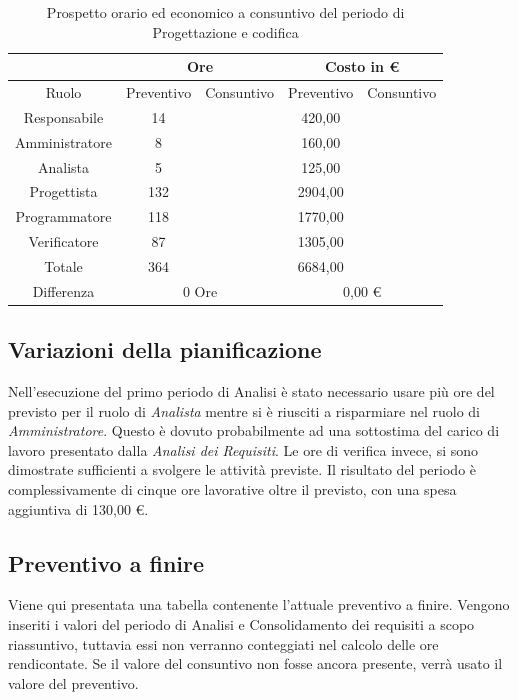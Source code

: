 \documentclass[./PianodiProgetto.tex]{subfiles}
\begin{document}
\begin{table}[H]
	\centering
	\begin{tabular}{|c|c|c|c|c|}
		\hline
		& \multicolumn{2}{c|}{Ore} & \multicolumn{2}{c|}{Costo in \euro{}}  \\ \hline
		Ruolo&Preventivo&Consuntivo&Preventivo&Consuntivo \\ \hline
		Responsabile&14& &420,00&  \\ \hline
		Amministratore&8& &160,00&  \\ \hline
		Analista&5& &125,00&  \\ \hline
		Progettista&132& &2904,00&  \\ \hline
		Programmatore&118& &1770,00&  \\ \hline
		Verificatore&87& &1305,00&  \\ \hline
		Totale&364& &6684,00&  \\ \hline
		Differenza& \multicolumn{2}{c|}{0 Ore} & \multicolumn{2}{c|}{0,00 \euro{}} \\ \hline
	\end{tabular}
	\caption{Prospetto orario ed economico a consuntivo del periodo di Progettazione e codifica}
\end{table}

\subsection{Variazioni della pianificazione}
Nell'esecuzione del primo periodo di Analisi è stato necessario usare più
ore del previsto per il ruolo di \textit{Analista} mentre si è riusciti a risparmiare nel ruolo di \textit{Amministratore}. Questo è dovuto
probabilmente ad una sottostima del carico di lavoro presentato dalla \textit{Analisi
	dei Requisiti}. Le ore di verifica invece, si sono dimostrate sufficienti a svolgere
le attività previste. Il risultato del periodo è complessivamente di cinque ore
lavorative oltre il previsto, con una spesa aggiuntiva di 130,00 \euro{}.

\subsection{Preventivo a finire}
Viene qui presentata una tabella contenente l'attuale preventivo a finire.
Vengono inseriti i valori del periodo di Analisi e Consolidamento dei requisiti a scopo riassuntivo, tuttavia essi non verranno conteggiati nel calcolo delle ore rendicontate. Se il valore del consuntivo non fosse ancora presente, verrà usato il valore del preventivo.
\end{document}
